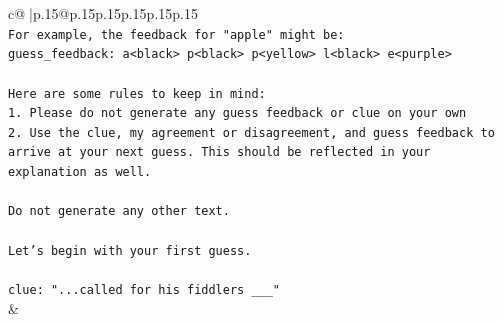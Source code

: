 \documentclass{article}
\begin{document}
{\begin{supertabular}{c@{$\;$}|p{.15\linewidth}@{}p{.15\linewidth}p{.15\linewidth}p{.15\linewidth}p{.15\linewidth}p{.15\linewidth}}
{{{\\ 
\texttt{For example, the feedback for "apple" might be:} \\
\texttt{guess\_feedback: a<black> p<black> p<yellow> l<black> e<purple>} \\
\\ 
\texttt{Here are some rules to keep in mind:} \\
\texttt{1. Please do not generate any guess feedback or clue on your own} \\
\texttt{2. Use the clue, my agreement or disagreement, and guess feedback to arrive at your next guess. This should be reflected in your explanation as well.} \\
\\ 
\texttt{Do not generate any other text.} \\
\\ 
\texttt{Let's begin with your first guess.} \\
\\ 
\texttt{clue: "...called for his fiddlers \_\_\_"} \\
            }
        }
    }
    & \\ \\


\end{supertabular}}
\end{document}
